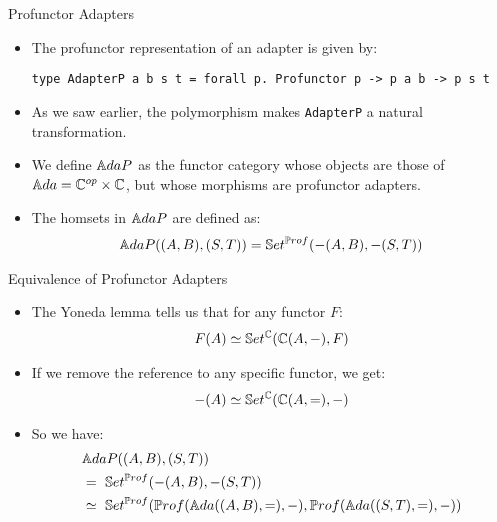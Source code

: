 \begin{frame}[fragile]{Profunctor Adapters}
	\begin{itemize}
		\item The profunctor representation of an adapter is given by:
		\begin{lstlisting}
type AdapterP a b s t = forall p. Profunctor p -> p a b -> p s t
		\end{lstlisting}
		\pause\item As we saw earlier, the polymorphism makes \texttt{AdapterP} a natural transformation.
		\pause\item We define $\mathbb{A}daP$ as the functor category whose objects are those of ${\mathbb{A}da} = \mathbb{C}^{op} \times \mathbb{C}$, but whose morphisms are profunctor adapters.
		\pause\item The homsets in $\mathbb{A}daP$ are defined as:
		\begin{align*}
			\mathbb{A}daP ((A,B),(S,T)) &= \mathbb{S}et^{\mathbb{P}rof}(-(A, B), -(S, T))\\
		\end{align*}
		\end{itemize}
\end{frame}
\begin{frame}[fragile]{Equivalence of Profunctor Adapters}
	\begin{itemize}
		\item The Yoneda lemma tells us that for any functor $F$:
		\begin{align*}
			F(A) \simeq \mathbb{S}et^{\mathbb{C}}(\mathbb{C}(A, -), F)
		\end{align*}
		\pause\item If we remove the reference to any specific functor, we get:
		\begin{align*}
			-(A) \simeq \mathbb{S}et^{\mathbb{C}}(\mathbb{C}(A, =), -)
		\end{align*}
		\vspace{-18pt}\pause\item So we have:
		\begin{align*}
			&\mathbb{A}daP ((A,B),(S,T))\\
			&=\ \mathbb{S}et^{{\mathbb{P}rof}}(-(A, B), -(S, T))\\ 
			&\simeq\ \mathbb{S}et^{{\mathbb{P}rof}}({\mathbb{P}rof}({\mathbb{A}da}((A, B), =), -), {\mathbb{P}rof}({\mathbb{A}da}((S, T), =), -))\\
		\end{align*}
	\end{itemize}
\end{frame}
